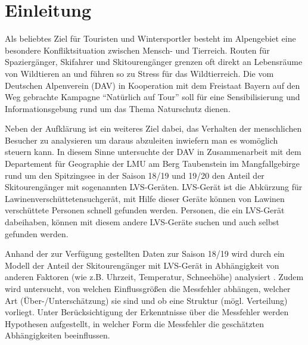 \documentclass[12pt]{article}
\begin{document}
	
	
	
	\vspace{5cm}
	
	
	
	
	
	
	
	\thispagestyle{empty}
	
	
	
	
	
	
	\begingroup
	\tableofcontents
	\newpage
	\listoffigures
	\listoftables
	\setcounter{page}{1}
	\thispagestyle{empty}
	
	\endgroup
	
	\newpage
	
	\section{Einleitung}
	\setcounter{page}{1}
	Als beliebtes Ziel für Touristen und Wintersportler besteht im Alpengebiet eine besondere Konfliktsituation zwischen Mensch- und Tierreich. Routen für Spaziergänger, Skifahrer und Skitourengänger grenzen oft direkt an Lebensräume von Wildtieren an und führen so zu Stress für das Wildtierreich. Die vom Deutschen Alpenverein (DAV) in Kooperation mit dem Freistaat Bayern auf den Weg gebrachte Kampagne "`Natürlich auf Tour"' soll für eine Sensibilisierung und Informationsgebung rund um das Thema Naturschutz dienen.
	
	Neben der Aufklärung ist ein weiteres Ziel dabei, das Verhalten der menschlichen Besucher zu analysieren um daraus abzuleiten inwiefern man es womöglich steuern kann. In diesem Sinne untersuchte der DAV in Zusammenarbeit mit dem Departement für Geographie der LMU am Berg Taubenstein im Mangfallgebirge rund um den Spitzingsee in der Saison 18/19 und 19/20 den Anteil der Skitourengänger mit sogenannten LVS-Geräten. LVS-Gerät ist die Abkürzung für Lawinenverschüttetensuchgerät, mit Hilfe dieser Geräte können von Lawinen verschüttete Personen schnell gefunden werden. Personen, die ein LVS-Gerät dabeihaben, können mit diesem andere LVS-Geräte suchen und auch selbst gefunden werden.
	
	Anhand der zur Verfügung gestellten Daten zur Saison 18/19 wird durch ein Modell der Anteil der Skitourengänger mit LVS-Gerät in Abhängigkeit von anderen Faktoren (wie z.B. Uhrzeit, Temperatur, Schneehöhe) analysiert .
	Zudem wird untersucht, von welchen Einflussgrößen die Messfehler abhängen, welcher Art (Über-/Unterschätzung) sie sind und ob eine Struktur (mögl. Verteilung) vorliegt.
	Unter Berücksichtigung der Erkenntnisse über die Messfehler werden Hypothesen aufgestellt, in welcher Form die Messfehler die geschätzten Abhängigkeiten beeinflussen.
	
\end{document}
